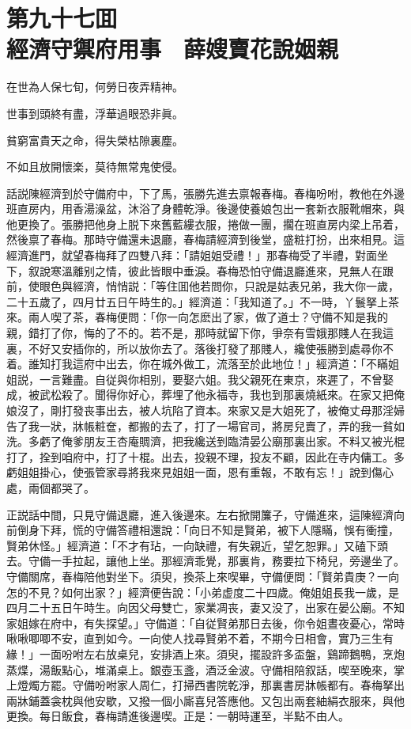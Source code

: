 
\chapter*{第九十七囬　\\經濟守禦府用事　薛嫂賣花說姻親}


\begin{myquote}
在世為人保七旬，何勞日夜弄精神。

世事到頭終有盡，浮華過眼恐非眞。

貧窮富貴天之命，得失榮枯隙裏塵。

不如且放開懷楽，莫待無常鬼使侵。
\end{myquote}

話説陳經濟到於守備府中，下了馬，張勝先進去禀報春梅。春梅吩咐，教他在外邊班直房内，用香湯澡盆，沐浴了身體乾淨。後邊使養娘包出一套新衣服靴帽來，與他更換了。張勝把他身上脱下來舊藍縷衣服，捲做一團，擱在班直房内梁上吊着，然後禀了春梅。那時守備還未退廳，春梅請經濟到後堂，盛粧打扮，出來相見。這經濟進門，就望春梅拜了四雙八拜：「請姐姐受禮！」那春梅受了半禮，對面坐下，叙說寒溫離别之情，彼此皆眼中垂淚。春梅恐怕守備退廳進來，見無人在跟前，使眼色與經濟，悄悄説：「等住囬他若問你，只說是姑表兄弟，我大你一歲，二十五歲了，四月廿五日午時生的。」經濟道：「我知道了。」不一時，丫鬟拏上茶來。兩人喫了茶，春梅便問：「你一向怎麽出了家，做了道士？守備不知是我的親，錯打了你，悔的了不的。若不是，那時就留下你，爭奈有雪娥那賤人在我這裏，不好又安插你的，所以放你去了。落後打發了那賤人，纔使張勝到處尋你不着。誰知打我這府中出去，你在城外做工，流落至於此地位！」經濟道：「不瞞姐姐説，一言難盡。自従與你相别，要娶六姐。我父親死在東京，來遲了，不曾娶成，被武松殺了。聞得你好心，葬埋了他永福寺，我也到那裏燒紙來。在家又把俺娘沒了，剛打發丧事出去，被人坑陷了資本。來家又是大姐死了，被俺丈母那淫婦告了我一狀，牀帳粧奩，都搬的去了，打了一場官司，將房兒賣了，弄的我一貧如洗。多虧了俺爹朋友王杏庵賙濟，把我纔送到臨清晏公廟那裏出家。不料又被光棍打了，拴到咱府中，打了十棍。出去，投親不理，投友不顧，因此在寺内傭工。多虧姐姐掛心，使張管家尋將我來見姐姐一面，恩有重報，不敢有忘！」說到傷心處，兩個都哭了。

正説話中間，只見守備退廳，進入後邊來。左右掀開簾子，守備進來，這陳經濟向前倒身下拜，慌的守備答禮相還說：「向日不知是賢弟，被下人隱瞞，悞有衝撞，賢弟休怪。」經濟道：「不才有玷，一向缺禮，有失親近，望乞恕罪。」又磕下頭去。守備一手拉起，讓他上坐。那經濟乖覺，那裏肯，務要拉下椅兒，旁邊坐了。守備關席，春梅陪他對坐下。須臾，換茶上來喫畢，守備便問：「賢弟貴庚？一向怎的不見？如何出家？」經濟便告說：「小弟虚度二十四歲。俺姐姐長我一歲，是四月二十五日午時生。向因父母雙亡，家業凋丧，妻又没了，出家在晏公廟。不知家姐嫁在府中，有失探望。」守備道：「自従賢弟那日去後，你令姐晝夜憂心，常時啾啾唧唧不安，直到如今。一向使人找尋賢弟不着，不期今日相會，實乃三生有緣！」一面吩咐左右放桌兒，安排酒上來。須臾，擺設許多盃盤，鷄蹄鵝鴨，烹炮蒸煠，湯飯點心，堆滿桌上。銀壺玉盞，酒泛金波。守備相陪叙話，喫至晚來，掌上燈燭方罷。守備吩咐家人周仁，打掃西書院乾淨，那裏書房牀帳都有。春梅拏出兩牀鋪蓋衾枕與他安歇，又撥一個小廝喜兒答應他。又包出兩套紬絹衣服來，與他更換。每日飯食，春梅請進後邊喫。正是：一朝時運至，半點不由人。

